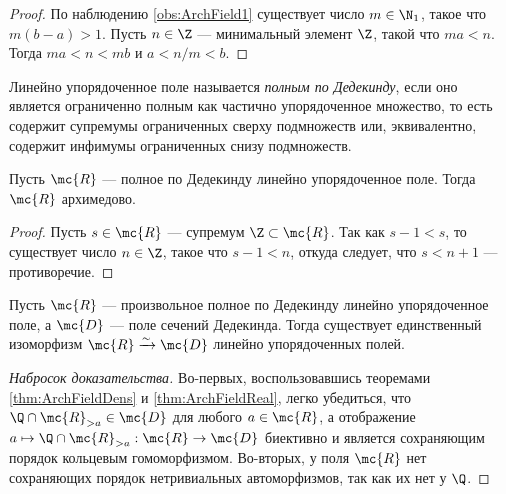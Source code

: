 \documentclass[
	extrafontsizes,
	11pt,
	hyphens,
]{memoir}
\begin{document}
\begin{proof}
По наблюдению \ref{obs:ArchField1} существует число \(m \in \N_1\), такое что \(m(b-a) > 1\). Пусть \(n \in \Z\) --- минимальный элемент \(\Z\), такой что \(ma < n\). Тогда \(ma < n < mb\) и \(a < n/m < b\).
\end{proof}

\begin{definition}
Линейно упорядоченное поле называется \emph{полным по Дедекинду}, если оно является ограниченно полным как частично упорядоченное множество, то есть содержит
супремумы ограниченных сверху подмножеств или, эквивалентно, содержит инфимумы ограниченных снизу подмножеств.
\end{definition}

\begin{theorem}
\label{thm:ArchFieldReal}
Пусть \(\mc{R}\) --- полное по Дедекинду линейно упорядоченное поле.
Тогда \(\mc{R}\) архимедово.
\end{theorem}

\begin{proof}
Пусть \(s \in \mc{R}\) --- супремум \(\Z \subset \mc{R}\).
Так как \(s - 1 < s\), то существует число \(n \in \Z\), такое что \(s - 1 < n\), откуда следует, что \(s < n + 1\) --- противоречие.
\end{proof}

\begin{theorem}
Пусть \(\mc{R}\) --- произвольное полное по Дедекинду линейно упорядоченное поле,
а \(\mc{D}\) --- поле сечений Дедекинда.
Тогда существует единственный изоморфизм \(\mc{R} \xrightarrow{\sim} \mc{D}\) линейно упорядоченных полей.
\end{theorem}

\begin{proof}[Набросок доказательства]
Во-первых, воспользовавшись теоремами \ref{thm:ArchFieldDens} и \ref{thm:ArchFieldReal}, легко убедиться, что \(\Q \cap \mc{R}_{> a} \in \mc{D}\) для любого \(a \in \mc{R}\), а отображение \(a \mapsto \Q \cap \mc{R}_{> a} : \mc{R} \to \mc{D}\) биективно и является сохраняющим порядок кольцевым гомоморфизмом.
Во-вторых, у поля \(\mc{R}\) нет сохраняющих порядок нетривиальных автоморфизмов, так как их нет у \(\Q\).
\end{proof}
\end{document}
